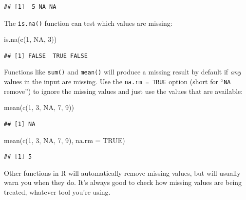 \documentclass[
]{book}
\newenvironment{Shaded}{\begin{snugshade}}{\end{snugshade}}
\newcommand{\AttributeTok}[1]{\textcolor[rgb]{0.77,0.63,0.00}{#1}}
\newcommand{\ConstantTok}[1]{\textcolor[rgb]{0.00,0.00,0.00}{#1}}
\newcommand{\DecValTok}[1]{\textcolor[rgb]{0.00,0.00,0.81}{#1}}
\newcommand{\FunctionTok}[1]{\textcolor[rgb]{0.00,0.00,0.00}{#1}}
\newcommand{\NormalTok}[1]{#1}
\begin{document}
\begin{verbatim}
## [1]  5 NA NA
\end{verbatim}

The \texttt{is.na()} function can test which values are missing:

\begin{Shaded}
\begin{Highlighting}[]
\FunctionTok{is.na}\NormalTok{(}\FunctionTok{c}\NormalTok{(}\DecValTok{1}\NormalTok{, }\ConstantTok{NA}\NormalTok{, }\DecValTok{3}\NormalTok{))}
\end{Highlighting}
\end{Shaded}

\begin{verbatim}
## [1] FALSE  TRUE FALSE
\end{verbatim}

Functions like \texttt{sum()} and \texttt{mean()} will produce a missing
result by default if \emph{any} values in the input are missing. Use the
\texttt{na.rm\ =\ TRUE} option (short for ``\texttt{NA} remove'') to ignore the missing values
and just use the values that are available:

\begin{Shaded}
\begin{Highlighting}[]
\FunctionTok{mean}\NormalTok{(}\FunctionTok{c}\NormalTok{(}\DecValTok{1}\NormalTok{, }\DecValTok{3}\NormalTok{, }\ConstantTok{NA}\NormalTok{, }\DecValTok{7}\NormalTok{, }\DecValTok{9}\NormalTok{))}
\end{Highlighting}
\end{Shaded}

\begin{verbatim}
## [1] NA
\end{verbatim}

\begin{Shaded}
\begin{Highlighting}[]
\FunctionTok{mean}\NormalTok{(}\FunctionTok{c}\NormalTok{(}\DecValTok{1}\NormalTok{, }\DecValTok{3}\NormalTok{, }\ConstantTok{NA}\NormalTok{, }\DecValTok{7}\NormalTok{, }\DecValTok{9}\NormalTok{), }\AttributeTok{na.rm =} \ConstantTok{TRUE}\NormalTok{)}
\end{Highlighting}
\end{Shaded}

\begin{verbatim}
## [1] 5
\end{verbatim}

Other functions in R will automatically remove missing values, but
will usually warn you when they do. It's always good to check
how missing values are being treated, whatever tool you're using.
\end{document}
